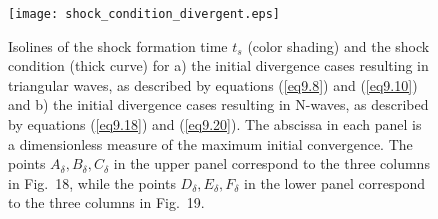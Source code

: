 \documentclass[10pt]{article}
\begin{document}
\begin{figure}[!th]                          %
\centerline{\texttt{[image: shock\_condition\_divergent.eps]}}
\caption{Isolines of the shock formation time $t_s$ (color shading) and the shock
condition (thick curve) for a) the initial divergence cases resulting in triangular
waves, as described by equations (\ref{eq9.8}) and (\ref{eq9.10}) and b) the
initial divergence cases resulting in N-waves, as described by
equations (\ref{eq9.18}) and (\ref{eq9.20}). The abscissa in each panel is
a dimensionless measure of the maximum initial convergence. The points
$A_\delta,B_\delta,C_\delta$ in the upper panel correspond to the three columns
in Fig.~18, while the points $D_\delta,E_\delta,F_\delta$ in the lower panel
correspond to the three columns in Fig.~19.}
\end{figure}
\end{document}

